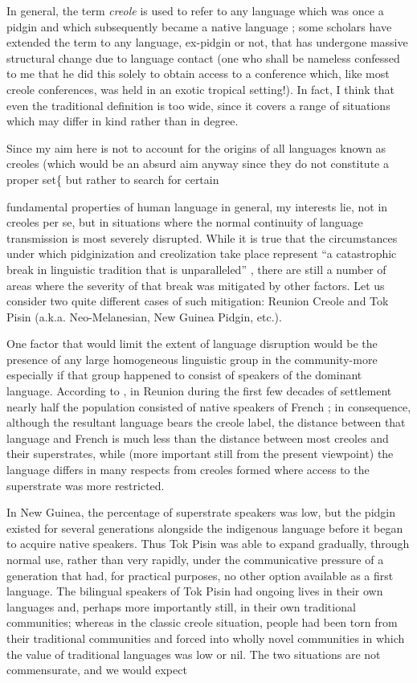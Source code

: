 In general, the term \textit{creole} is used to refer to any language which was once a pidgin and which subsequently became a native language ; some scholars have extended the term to any language, ex-pidgin or not, that has undergone massive structural change due to language contact (one who shall be nameless confessed to me that he did this solely to obtain access to a conference which, like most creole conferences, was held in an exotic tropical setting!). In fact, I think that even the traditional definition is too wide, since it covers a range of situations which may differ in kind rather than in degree.

Since my aim here is not to account for the origins of all lan\-guages known as creoles (which would be an absurd aim anyway since they do not constitute a proper set\{ but rather to search for certain

fundamental properties of human language in general, my interests lie, not in creoles per se, but in situations where the normal continuity of language transmission is most severely disrupted. While it is true that the circumstances under which pidginization and creolization take place represent ``a catastrophic break in linguistic tradition that is unparalleled'' \citep[24]{Sankoff1979}, there are still a number of areas where the severity of that break was mitigated by other factors. Let us consider two quite different cases of such mitigation: Reunion Creole and Tok Pisin (a.k.a. Neo-Melanesian, New Guinea Pidgin, etc.).

One factor that would limit the extent of language disruption would be the presence of any large homogeneous linguistic group in the community-more especially if that group happened to consist of speakers of the dominant language. According to \citet{Chaudenson1974}, in Reunion during the first few decades of settlement nearly half the population consisted of native speakers of French ; in conse\-quence, although the resultant language bears the creole label, the distance between that language and French is much less than the distance between most creoles and their superstrates, while (more important still from the present viewpoint) the language differs in many respects from creoles formed where access to the superstrate was more restricted.

In New Guinea, the percentage of superstrate speakers was low, but the pidgin existed for several generations alongside the indigenous language before it began to acquire native speakers. Thus Tok Pisin was able to expand gradually, through normal use, rather than very rapidly, under the communicative pressure of a generation that had, for practical purposes, no other option available as a first language. The bilingual speakers of Tok Pisin had ongoing lives in their own languages and, perhaps more importantly still, in their own traditional communities; whereas in the classic creole situation, people had been torn from their traditional communities and forced into wholly novel communities in which the value of traditional languages was low or nil. The two situations are not commensurate, and we would expect

